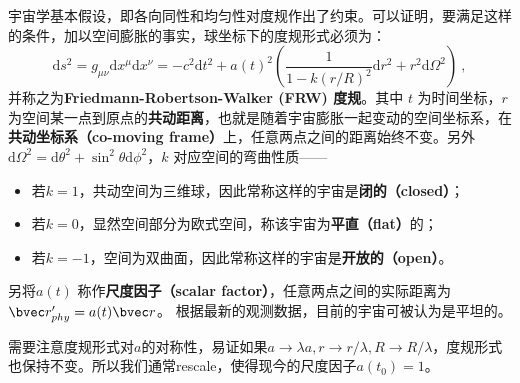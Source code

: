 
宇宙学基本假设，即各向同性和均匀性对度规作出了约束。可以证明，要满足这样的条件，加以空间膨胀的事实，球坐标下的度规形式必须为：
\begin{equation}
\mathrm{d}s^2=g_{\mu\nu}\mathrm{d}x^{\mu}\mathrm{d}x^{\nu}=-c^2\mathrm{d}t^2+a(t)^2 \left( \frac{1}{1-k(r/R)^2}\mathrm{d}r^2+r^2 \mathrm{d} \Omega^2\right)~,
\end{equation}
并称之为\textbf{Friedmann-Robertson-Walker (FRW) 度规}。其中 $t$ 为时间坐标，$r$ 为空间某一点到原点的\textbf{共动距离}，也就是随着宇宙膨胀一起变动的空间坐标系，在\textbf{共动坐标系（co-moving frame）}上，任意两点之间的距离始终不变。另外$\mathrm{d} \Omega^2 =\mathrm{d} \theta^2 + \sin^2\theta\mathrm{d} \phi^2 $，$k$ 对应空间的弯曲性质——
\begin{itemize}
\item 若$k=1$，共动空间为三维球，因此常称这样的宇宙是\textbf{闭的（closed）}；
\item 若$k=0$，显然空间部分为欧式空间，称该宇宙为\textbf{平直（flat）}的；
\item 若$k=-1$，空间为双曲面，因此常称这样的宇宙是\textbf{开放的（open）}。
\end{itemize}
 另将$a(t)$ 称作\textbf{尺度因子（scalar factor）}，任意两点之间的实际距离为$\bvec r'_{phy}=a(t)\bvec r$。
根据最新的观测数据，目前的宇宙可被认为是平坦的。

需要注意度规形式对$a$的对称性，易证如果$a\rightarrow \lambda a,r\rightarrow r/\lambda, R\rightarrow R/\lambda$，度规形式也保持不变。所以我们通常rescale，使得现今的尺度因子$a(t_0)=1$。


